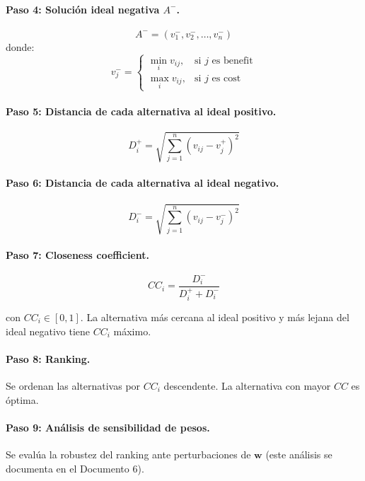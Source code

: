 \documentclass[12pt,a4paper,oneside]{book}
\begin{document}
\paragraph{Paso 4: Solución ideal negativa $A^-$.}
\begin{equation}
A^- = (v_1^-, v_2^-, \ldots, v_n^-)
\end{equation}
donde:
\begin{equation}
v_j^- = \begin{cases}
\min_i v_{ij}, & \text{si } j \text{ es benefit} \\
\max_i v_{ij}, & \text{si } j \text{ es cost}
\end{cases}
\end{equation}

\paragraph{Paso 5: Distancia de cada alternativa al ideal positivo.}
\begin{equation}
D_i^+ = \sqrt{\sum_{j=1}^{n}(v_{ij} - v_j^+)^2}
\label{doc5:eq:topsis5}
\end{equation}

\paragraph{Paso 6: Distancia de cada alternativa al ideal negativo.}
\begin{equation}
D_i^- = \sqrt{\sum_{j=1}^{n}(v_{ij} - v_j^-)^2}
\label{doc5:eq:topsis6}
\end{equation}

\paragraph{Paso 7: Closeness coefficient.}
\begin{equation}
\boxed{CC_i = \frac{D_i^-}{D_i^+ + D_i^-}}
\label{doc5:eq:topsis7}
\end{equation}

con $CC_i \in [0, 1]$. La alternativa más cercana al ideal positivo y más lejana del ideal negativo tiene $CC_i$ máximo.

\paragraph{Paso 8: Ranking.} Se ordenan las alternativas por $CC_i$ descendente. La alternativa con mayor $CC$ es óptima.

\paragraph{Paso 9: Análisis de sensibilidad de pesos.} Se evalúa la robustez del ranking ante perturbaciones de $\mathbf{w}$ (este análisis se documenta en el Documento 6).
\end{document}
